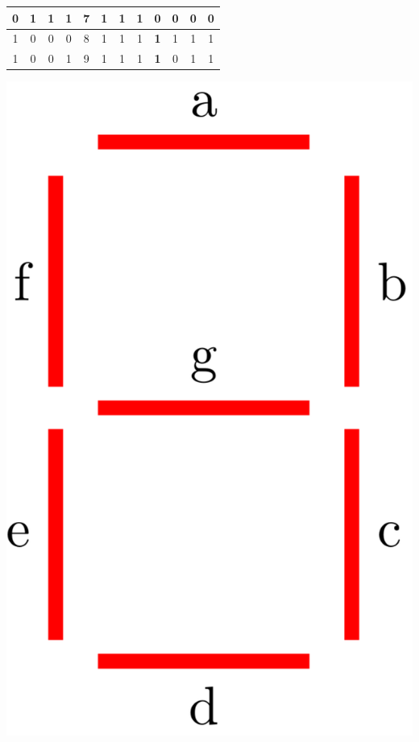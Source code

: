 \documentclass[10pt, oneside]{article}
\begin{document}
\begin{minipage}{0.69\linewidth}
\begin{tabular}{|c|c|c|c|c|c|c|c|c|c|c|c|}
        \hline
        0     & 1     & 1     & 1     & 7       & 1          & 1          & 1          & \textbf{0}        & 0          & 0          & 0          \\
        \hline
        1     & 0     & 0     & 0     & 8       & 1          & 1          & 1          & \textbf{1}        & 1          & 1          & 1          \\
        \hline
        1     & 0     & 0     & 1     & 9       & 1          & 1          & 1          & \textbf{1}        & 0          & 1          & 1          \\
        \hline
    \end{tabular}
    \egroup
\end{minipage}
\hfill
\begin{minipage}{0.29\linewidth}
    \centering
    \includegraphics[width=0.85\linewidth]{./assets/abbildung-01-01.png}
    \vfill
\end{minipage}
\end{document}
